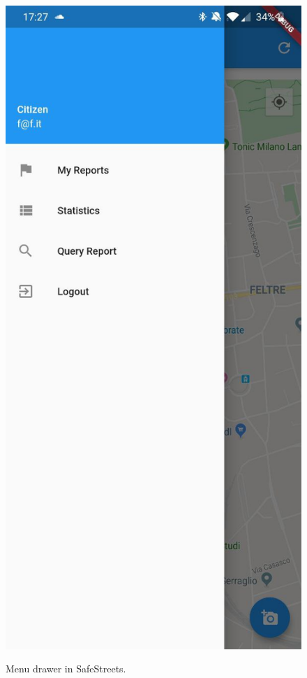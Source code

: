 \documentclass[../RASD.tex]{subfiles}
\begin{document}
    \begin{figure}[H]
        \centering
        \includegraphics[scale = 0.2]{assets/app_screenshots/menu.jpg}\\[1.6 cm]
        \caption[\textit{Menu} Screenshot]{Menu drawer in SafeStreets.}
    \end{figure}
\end{document}
